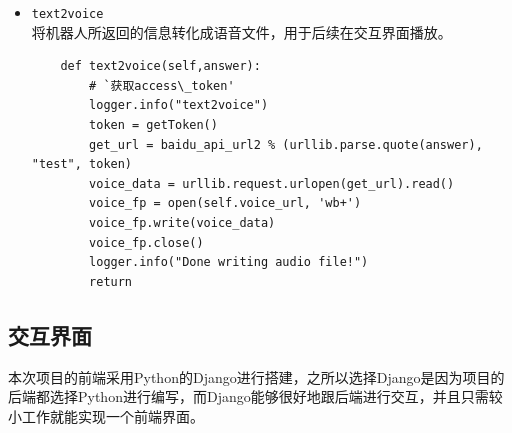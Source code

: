 \documentclass[logo,reportComp]{thesis}
\begin{document}
\begin{itemize}
\begin{itemize}
        \item \verb'text2voice'\\
        将机器人所返回的信息转化成语音文件，用于后续在交互界面播放。
\begin{lstlisting}
    def text2voice(self,answer):
        # `获取access\_token'
        logger.info("text2voice")
        token = getToken()
        get_url = baidu_api_url2 % (urllib.parse.quote(answer), "test", token)
        voice_data = urllib.request.urlopen(get_url).read()
        voice_fp = open(self.voice_url, 'wb+')
        voice_fp.write(voice_data)
        voice_fp.close()
        logger.info("Done writing audio file!")
        return
\end{lstlisting}
        
    \end{itemize}
\end{itemize}


\subsection{交互界面}
本次项目的前端采用Python的Django进行搭建，之所以选择Django是因为项目的后端都选择Python进行编写，而Django能够很好地跟后端进行交互，并且只需较小工作就能实现一个前端界面。
\end{document}
